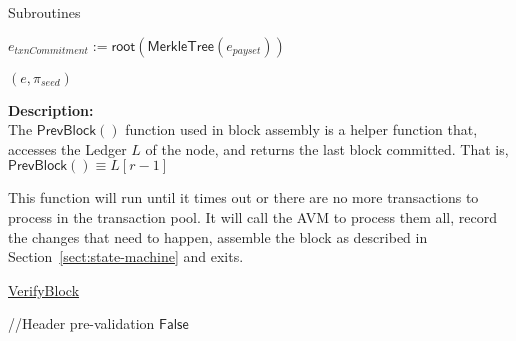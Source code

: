 \documentclass[10pt,a4paper]{article}
\begin{document}
\begin{section}{Subroutines}
\begin{algorithm}[H]
\begin{algorithmic}[1]



    \State $e_{txnCommitment} := \mathsf{root}(\mathsf{MerkleTree}(e_{payset}))$

    \State \Return $(e, \pi_{seed})$

    \EndFunction
    \end{algorithmic}
\end{algorithm}

\noindent \textbf{Description:}\\
The $\mathsf{PrevBlock()}$ function used in block assembly is a helper function that,
accesses the Ledger $L$ of the node, and returns the last block committed. That is, 
$\mathsf{PrevBlock()} \equiv L[r-1]$

This function will run until it times out or there are no more transactions to 
process in the transaction pool. It will call the AVM to process them all, 
record the changes that need to happen, assemble the block as described in
Section~\ref{sect:state-machine} and exits.


\begin{algorithm}[H]
    \caption{\underline{VerifyBlock}}    
    \label{algo:verify-block}
    \begin{algorithmic}[1]

    \State //Header pre-validation
     \Return $\mathsf{False}$
    \EndIf \\


    



\end{algorithmic}
\end{algorithm}
\end{section}
\end{document}
